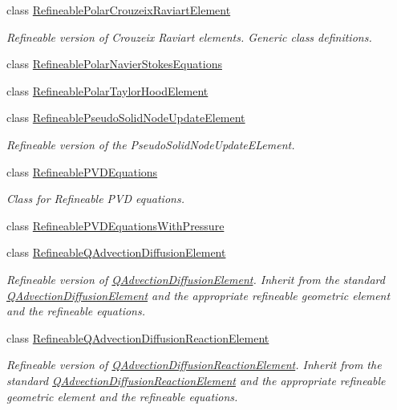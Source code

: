 \begin{DoxyCompactItemize}
\item 
class \hyperlink{classoomph_1_1RefineablePolarCrouzeixRaviartElement}{Refineable\+Polar\+Crouzeix\+Raviart\+Element}
\begin{DoxyCompactList}\small\item\em Refineable version of Crouzeix Raviart elements. Generic class definitions. \end{DoxyCompactList}\item 
class \hyperlink{classoomph_1_1RefineablePolarNavierStokesEquations}{Refineable\+Polar\+Navier\+Stokes\+Equations}
\item 
class \hyperlink{classoomph_1_1RefineablePolarTaylorHoodElement}{Refineable\+Polar\+Taylor\+Hood\+Element}
\item 
class \hyperlink{classoomph_1_1RefineablePseudoSolidNodeUpdateElement}{Refineable\+Pseudo\+Solid\+Node\+Update\+Element}
\begin{DoxyCompactList}\small\item\em Refineable version of the Pseudo\+Solid\+Node\+Update\+E\+Lement. \end{DoxyCompactList}\item 
class \hyperlink{classoomph_1_1RefineablePVDEquations}{Refineable\+P\+V\+D\+Equations}
\begin{DoxyCompactList}\small\item\em Class for Refineable P\+VD equations. \end{DoxyCompactList}\item 
class \hyperlink{classoomph_1_1RefineablePVDEquationsWithPressure}{Refineable\+P\+V\+D\+Equations\+With\+Pressure}
\item 
class \hyperlink{classoomph_1_1RefineableQAdvectionDiffusionElement}{Refineable\+Q\+Advection\+Diffusion\+Element}
\begin{DoxyCompactList}\small\item\em Refineable version of \hyperlink{classoomph_1_1QAdvectionDiffusionElement}{Q\+Advection\+Diffusion\+Element}. Inherit from the standard \hyperlink{classoomph_1_1QAdvectionDiffusionElement}{Q\+Advection\+Diffusion\+Element} and the appropriate refineable geometric element and the refineable equations. \end{DoxyCompactList}\item 
class \hyperlink{classoomph_1_1RefineableQAdvectionDiffusionReactionElement}{Refineable\+Q\+Advection\+Diffusion\+Reaction\+Element}
\begin{DoxyCompactList}\small\item\em Refineable version of \hyperlink{classoomph_1_1QAdvectionDiffusionReactionElement}{Q\+Advection\+Diffusion\+Reaction\+Element}. Inherit from the standard \hyperlink{classoomph_1_1QAdvectionDiffusionReactionElement}{Q\+Advection\+Diffusion\+Reaction\+Element} and the appropriate refineable geometric element and the refineable equations. \end{DoxyCompactList}\item 

\end{DoxyCompactItemize}
